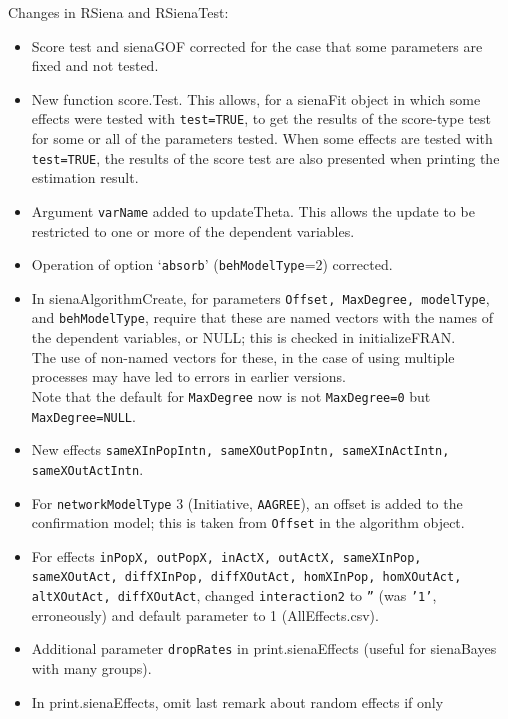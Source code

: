 \documentclass[a4paper,fleqn,11pt]{article}
\newcommand{\+}{\, + \,}
\newcommand{\sfn}[1]{\textsf{#1}}
\begin{document}
\begin{small}
\begin{itemize}
Changes in RSiena and RSienaTest:
\begin{itemize}
 \item Score test and \sfn{sienaGOF} corrected for the case that some parameters
      are fixed and not tested.
 \item New function \sfn{score.Test}. This allows, for a \sfn{sienaFit}
     object in which some effects were tested with \texttt{test=TRUE}, to get the
     results of the score-type test for some or all of the parameters tested.
     When some effects are tested with \texttt{test=TRUE}, the
     results of the score test are also presented when printing the estimation
     result.
 \item Argument \texttt{varName} added to \sfn{updateTheta}.
     This allows the update to be restricted to one or more of the
     dependent variables.
 \item Operation of option `\texttt{absorb}' (\texttt{behModelType}=2) corrected.
 \item In \sfn{sienaAlgorithmCreate}, for parameters
     \texttt{Offset, MaxDegree, modelType},
     and \texttt{behModelType}, require that these are named vectors with the names
     of the dependent variables, or NULL; this is checked in \sfn{initializeFRAN}.\\
     The use of non-named vectors for these, in the case of using multiple processes
     may have led to errors in earlier versions.\\
     Note that the default for \texttt{MaxDegree} now is not \texttt{MaxDegree=0}
     but \texttt{MaxDegree=NULL}.
 \item New effects \texttt{sameXInPopIntn, sameXOutPopIntn, sameXInActIntn,
     sameXOutActIntn}.
 \item For \texttt{networkModelType} 3 (Initiative, \texttt{AAGREE}),
     an offset is added to the
     confirmation model; this is taken from \texttt{Offset} in the algorithm object.
 \item For effects \texttt{inPopX, outPopX, inActX, outActX, sameXInPop, sameXOutAct,
     diffXInPop, diffXOutAct, homXInPop, homXOutAct, altXOutAct, diffXOutAct},
     changed \texttt{interaction2} to \texttt{''} (was \texttt{'1'}, erroneously)
     and default parameter to 1 (\sfn{AllEffects.csv}).
 \item Additional parameter \texttt{dropRates} in \sfn{print.sienaEffects}
    (useful for \sfn{sienaBayes} with many groups).
 \item In \sfn{print.sienaEffects}, omit last remark about random effects if only

\end{itemize}
\end{itemize}
\end{small}
\end{document}
